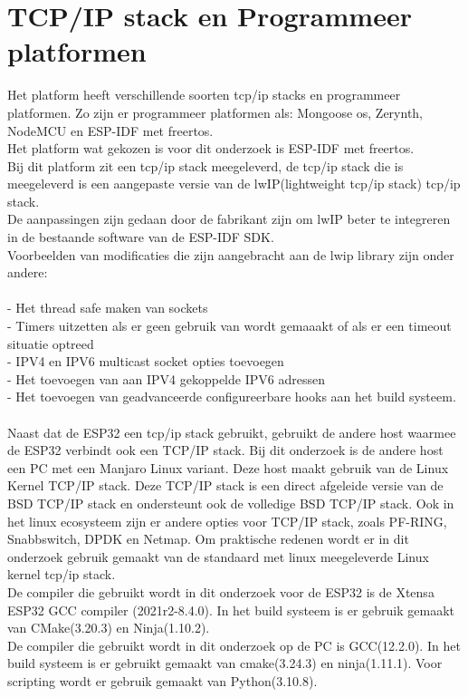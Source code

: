 \documentclass[../DCM2_Verslag.tex]{subfiles}
\begin{document}
\section{TCP/IP stack en Programmeer platformen}
Het platform heeft verschillende soorten tcp/ip stacks en programmeer platformen. Zo zijn er programmeer platformen als: Mongoose os, Zerynth, NodeMCU en ESP-IDF met freertos.\\ Het platform wat gekozen is voor dit onderzoek is ESP-IDF met freertos. 
\\Bij dit platform zit een tcp/ip stack meegeleverd, de tcp/ip stack die is meegeleverd is een aangepaste versie van de lwIP(lightweight tcp/ip stack) tcp/ip stack. 
\\De aanpassingen zijn gedaan door de fabrikant zijn om lwIP beter te integreren in de bestaande software van de ESP-IDF SDK. 
\\Voorbeelden van modificaties die zijn aangebracht aan de lwip library zijn onder andere: \\\\
- Het thread safe maken van sockets\\
- Timers uitzetten als er geen gebruik van wordt gemaaakt of als er een timeout situatie optreed\\
- IPV4 en IPV6 multicast socket opties toevoegen\\
- Het toevoegen van aan IPV4 gekoppelde IPV6 adressen\\
- Het toevoegen van geadvanceerde configureerbare hooks aan het build systeem.\\\\
Naast dat de ESP32 een tcp/ip stack gebruikt, gebruikt de andere host waarmee de ESP32 verbindt ook een TCP/IP stack. Bij dit onderzoek is de andere host een PC met een Manjaro Linux variant. Deze host maakt gebruik van de Linux Kernel TCP/IP stack. Deze TCP/IP stack is een direct afgeleide versie van de BSD TCP/IP stack en ondersteunt ook de volledige BSD TCP/IP stack. Ook in het linux ecosysteem zijn er andere opties voor TCP/IP stack, zoals PF-RING, Snabbswitch, DPDK en Netmap. Om praktische redenen wordt er in dit onderzoek gebruik gemaakt van de standaard met linux meegeleverde Linux kernel tcp/ip stack. \\
De compiler die gebruikt wordt in dit onderzoek voor de ESP32 is de Xtensa ESP32 GCC compiler (2021r2-8.4.0). In het build systeem is er gebruik gemaakt van CMake(3.20.3) en Ninja(1.10.2).\\
De compiler die gebruikt wordt in dit onderzoek op de PC is GCC(12.2.0). In het build systeem is er gebruikt gemaakt van cmake(3.24.3) en ninja(1.11.1). Voor scripting wordt er gebruik gemaakt van Python(3.10.8).\\
\end{document}
